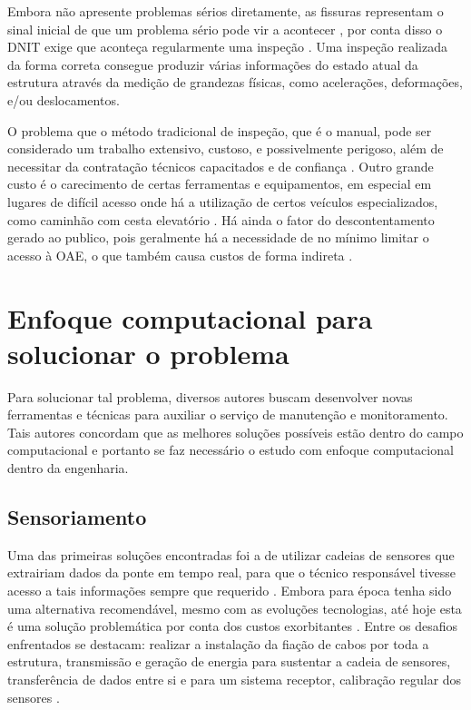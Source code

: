 Embora não apresente problemas sérios diretamente, as fissuras representam o sinal inicial de que um problema sério pode vir a acontecer \cite{alani2014integrated}, por conta disso o DNIT exige que aconteça regularmente uma inspeção \cite{dnit2004}.
Uma inspeção realizada da forma correta consegue produzir várias informações do estado atual da estrutura através da
medição de grandezas físicas, como acelerações, deformações, e/ou deslocamentos.

O problema que o método tradicional de inspeção, que é o manual, pode ser considerado um trabalho extensivo, custoso, e possivelmente perigoso, além de necessitar da contratação técnicos capacitados e de confiança \cite{adhikari2014image}.
Outro grande custo é o carecimento de certas ferramentas e equipamentos, em especial em lugares de difícil acesso onde há a utilização de certos veículos especializados, como caminhão com cesta elevatório \cite{dorafshan2018bridge}.
Há ainda o fator do descontentamento gerado ao publico, pois geralmente há a necessidade de no mínimo limitar o acesso à OAE, o que também causa custos de forma indireta \cite{catbas2018vision}.

\section{Enfoque computacional para solucionar o problema}

Para solucionar tal problema, diversos autores buscam desenvolver novas ferramentas e técnicas para auxiliar o serviço de manutenção e monitoramento. 
Tais autores concordam que as melhores soluções possíveis estão dentro do campo computacional e portanto se faz necessário o estudo com enfoque computacional dentro da engenharia.

\subsection{Sensoriamento}

Uma das primeiras soluções encontradas foi a de utilizar cadeias de sensores que extrairiam dados da ponte em tempo real, para que o técnico responsável tivesse acesso a tais informações sempre que requerido \cite{spencer2019advances}.
Embora para época tenha sido uma alternativa recomendável, mesmo com as evoluções tecnologias, até hoje esta é uma solução problemática por conta dos custos exorbitantes \cite{Zhuang2022}.
Entre os desafios enfrentados se destacam: realizar a instalação da fiação de cabos por toda a estrutura, transmissão e geração de energia para sustentar a cadeia de sensores, transferência de dados entre si e para um sistema receptor, calibração regular dos sensores \cite{catbas2018vision}.

